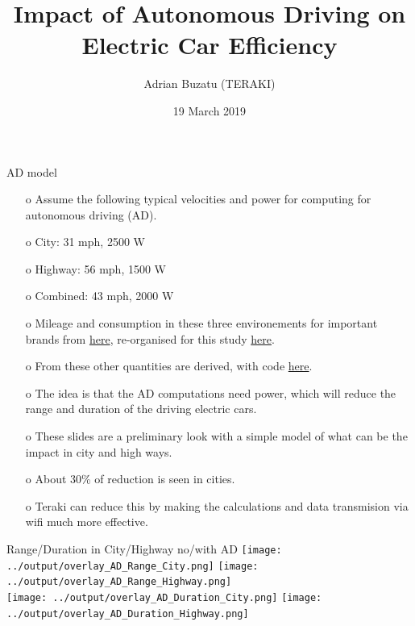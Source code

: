 \documentclass{beamer}
\title[AD impact on electric car efficiency]{Impact of Autonomous Driving on Electric Car Efficiency}
\author[Adrian Buzatu (TERAKI) ]{Adrian Buzatu (TERAKI)}
\date{19 March 2019}
\begin{document}

\frame{\titlepage} 
\def \AdrianSize {0.50}
\def \AdrianSizeOne {1.00}



\begin{frame}{AD model}
\begin{enumerate}
\item[o] Assume the following typical velocities and power for computing for autonomous driving (AD).
\item[o] City: 31 mph, 2500 W
\item[o] Highway: 56 mph, 1500 W
\item[o] Combined: 43 mph, 2000 W
\item[o] Mileage and consumption in these three environements for important brands from \href{https://pushevs.com/electric-car-range-efficiency-epa/}{here}, re-organised for this study \href{https://gitlab.cern.ch/abuzatu/BuzatuPython/blob/master/examples/teraki/electricCarEfficiency/input/data.txt}{here}.
\item[o] From these other quantities are derived, with code \href{https://gitlab.cern.ch/abuzatu/BuzatuPython/blob/master/examples/teraki/electricCarEfficiency/electricCarEfficiency.py}{here}.
\item[o] The idea is that the AD computations need power, which will reduce the range and duration of the driving electric cars.
\item[o] These slides are a preliminary look with a simple model of what can be the impact in city and high ways.
\item[o] About 30\% of reduction is seen in cities. 
\item[o] Teraki can reduce this by making the calculations and data transmision via wifi much more effective.
\end{enumerate}
\end{frame}

\begin{frame}{Range/Duration in City/Highway no/with AD}
\centering
\texttt{[image: ../output/overlay\_AD\_Range\_City.png]}
\texttt{[image: ../output/overlay\_AD\_Range\_Highway.png]}\\
\texttt{[image: ../output/overlay\_AD\_Duration\_City.png]}
\texttt{[image: ../output/overlay\_AD\_Duration\_Highway.png]}\\
\end{frame}
\end{document}
